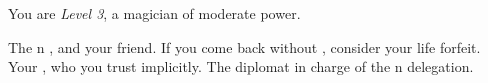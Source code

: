 \documentclass[char]{NeptuneBall}
\begin{document}
\begin{itemz}[Notes]
	\item You are \emph{Level 3}, a magician of moderate power.
\end{itemz}

\begin{contacts}
  \contact{\cPrince{}} The \pPacifica{}n \cPrince{\Prince}, and your friend. If you come back without \cPrince{\them}, consider your life forfeit.
  \contact{\cSpy{}} Your \cSpy{\sibling}, who you trust implicitly.
  \contact{\cDiplomat{}} The diplomat in charge of the \pPacifica{}n delegation.
\end{contacts}
\end{document}
